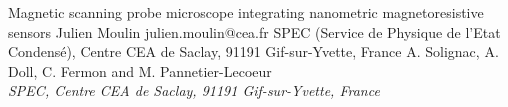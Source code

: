 \begin{conf-abstract}[]
{Magnetic scanning probe microscope integrating nanometric magnetoresistive sensors}
{\color{blue} Julien Moulin}
{julien.moulin@cea.fr}
{SPEC (Service de Physique de l'Etat Condensé), Centre CEA de Saclay, 91191 Gif-sur-Yvette, France}
{{\color{blue}A. Solignac, A. Doll, C. Fermon and M. Pannetier-Lecoeur}\\ \textit{SPEC, Centre CEA de Saclay, 91191 Gif-sur-Yvette, France}\\ 
\decofourleft \decofourright}





\printbibliography[heading=none]

\end{conf-abstract}

